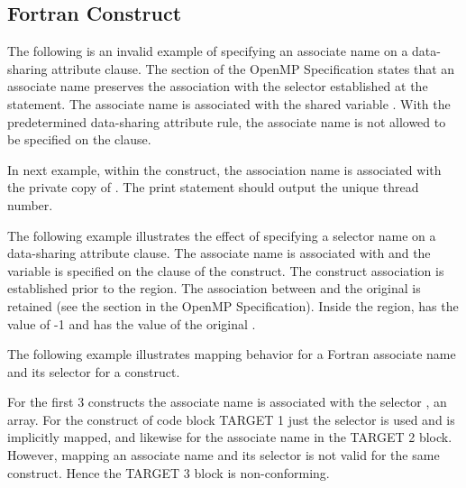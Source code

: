 \begin{fortranspecific}[4ex]
\section{Fortran  Construct}
\label{sec:associate}

The following is an invalid example of specifying an associate name on a data-sharing attribute 
clause. The  section of the OpenMP
Specification states that an associate name preserves the association
with the selector established at the  statement. The associate 
name  is associated with the shared variable . With the predetermined data-sharing 
attribute rule, the associate name  is not allowed to be specified on the  
clause.

{}

In next example, within the  construct, the association name  
is associated with the private copy of . The print statement should output the 
unique thread number.


The following example illustrates the effect of specifying a selector name on a data-sharing 
attribute clause. The associate name  is associated with  and the variable  
is specified on the  clause of the  construct. 
The construct association is established prior to the  region. 
The association between  and the original  is retained (see the  section in the OpenMP Specification). Inside the 
region,  has the value of -1 and  has the value of the original .


\label{sec:associate_target}

\bigskip
The following example illustrates mapping behavior for a Fortran
associate name and its selector for a  construct.

For the first 3  constructs the associate name  is
associated with the selector , an array.  
For the  construct of code block TARGET 1 just the selector
 is used and is implicitly mapped,
and likewise for the associate name  in the TARGET 2 block.
However, mapping an associate name and its selector is not valid for the same
 construct.  Hence the TARGET 3 block is non-conforming.



\end{fortranspecific}
